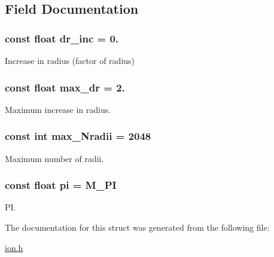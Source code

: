 \subsection{Field Documentation}
\hypertarget{struct_c_o_n_s_t_a_n_t_s_aee74bf2783f87d610cfb7a42933cb3a3}{
\subsubsection[{dr\+\_\+inc}]{\setlength{\rightskip}{0pt plus 5cm}const float dr\+\_\+inc = 0.}}\label{struct_c_o_n_s_t_a_n_t_s_aee74bf2783f87d610cfb7a42933cb3a3}


Increase in radius (factor of radius) 

\hypertarget{struct_c_o_n_s_t_a_n_t_s_a5ddc9828f90dc883b9baf3dfab1cd3e6}{
\subsubsection[{max\+\_\+dr}]{\setlength{\rightskip}{0pt plus 5cm}const float max\+\_\+dr = 2.}}\label{struct_c_o_n_s_t_a_n_t_s_a5ddc9828f90dc883b9baf3dfab1cd3e6}


Maximum increase in radius. 

\hypertarget{struct_c_o_n_s_t_a_n_t_s_afe3adcf3ff974c278558c412f9ba9aaa}{
\subsubsection[{max\+\_\+\+Nradii}]{\setlength{\rightskip}{0pt plus 5cm}const int max\+\_\+\+Nradii = 2048}}\label{struct_c_o_n_s_t_a_n_t_s_afe3adcf3ff974c278558c412f9ba9aaa}


Maximum number of radii. 

\hypertarget{struct_c_o_n_s_t_a_n_t_s_abce8f0db8a5282e441988c8d2e73f79e}{
\subsubsection[{pi}]{\setlength{\rightskip}{0pt plus 5cm}const float pi = M\+\_\+\+P\+I}}\label{struct_c_o_n_s_t_a_n_t_s_abce8f0db8a5282e441988c8d2e73f79e}


P\+I. 



The documentation for this struct was generated from the following file\+:\begin{DoxyCompactItemize}
\item 
\hyperlink{ion_8h}{ion.\+h}\end{DoxyCompactItemize}
